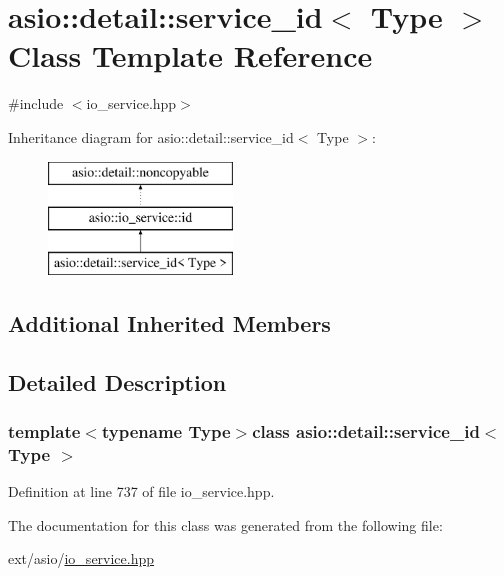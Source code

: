 \hypertarget{classasio_1_1detail_1_1service__id}{}\section{asio\+:\+:detail\+:\+:service\+\_\+id$<$ Type $>$ Class Template Reference}
\label{classasio_1_1detail_1_1service__id}


{\ttfamily \#include $<$io\+\_\+service.\+hpp$>$}

Inheritance diagram for asio\+:\+:detail\+:\+:service\+\_\+id$<$ Type $>$\+:\begin{figure}[H]
\begin{center}
\leavevmode
\includegraphics[height=3.000000cm]{classasio_1_1detail_1_1service__id}
\end{center}
\end{figure}
\subsection*{Additional Inherited Members}


\subsection{Detailed Description}
\subsubsection*{template$<$typename Type$>$class asio\+::detail\+::service\+\_\+id$<$ Type $>$}



Definition at line 737 of file io\+\_\+service.\+hpp.



The documentation for this class was generated from the following file\+:\begin{DoxyCompactItemize}
\item 
ext/asio/\hyperlink{io__service_8hpp}{io\+\_\+service.\+hpp}\end{DoxyCompactItemize}
